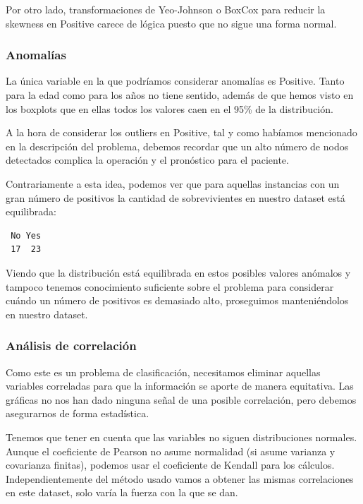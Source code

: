 \vspace{\baselineskip}

Por otro lado, transformaciones de Yeo-Johnson o BoxCox para reducir la skewness en Positive carece de lógica puesto que no sigue una forma normal.

\subsubsection{Anomalías}

La única variable en la que podríamos considerar anomalías es Positive. Tanto para la edad como para los años no tiene sentido, además de que hemos visto en los boxplots que en ellas todos los valores caen en el 95\% de la distribución.

\vspace{\baselineskip}

A la hora de considerar los outliers en Positive, tal y como habíamos mencionado en la descripción del problema, debemos recordar que un alto número de nodos detectados complica la operación y el pronóstico para el paciente.

Contrariamente a esta idea, podemos ver que para aquellas instancias con un gran número de positivos la cantidad de sobrevivientes en nuestro dataset está equilibrada:

\begin{verbatim}
 No Yes 
 17  23 
\end{verbatim}

Viendo que la distribución está equilibrada en estos posibles valores anómalos y tampoco tenemos conocimiento suficiente sobre el problema para considerar cuándo un número de positivos es demasiado alto, proseguimos manteniéndolos en nuestro dataset.

\subsubsection{Análisis de correlación}

Como este es un problema de clasificación, necesitamos eliminar aquellas variables correladas para que la información se aporte de manera equitativa. Las gráficas no nos han dado ninguna señal de una posible correlación, pero debemos asegurarnos de forma estadística.

\vspace{\baselineskip}

Tenemos que tener en cuenta que las variables no siguen distribuciones normales. Aunque el coeficiente de Pearson no asume normalidad (si asume varianza y covarianza finitas), podemos usar el coeficiente de Kendall para los cálculos. Independientemente del método usado vamos a obtener las mismas correlaciones en este dataset, solo varía la fuerza con la que se dan.

